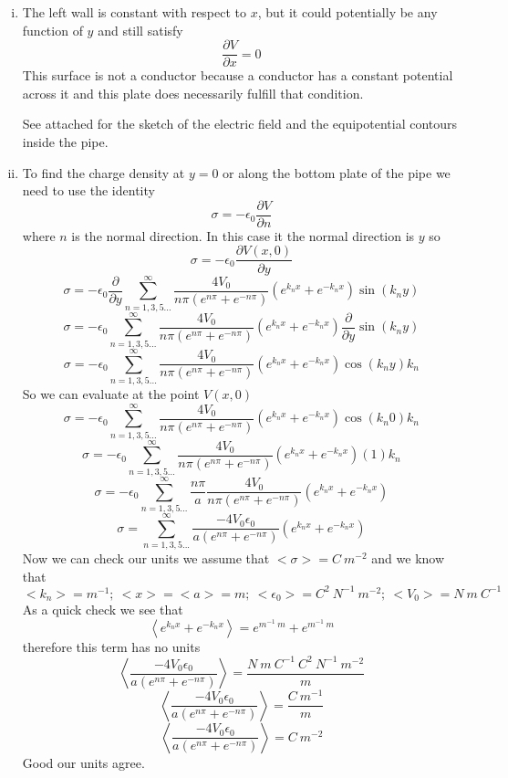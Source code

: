 \documentclass[11pt]{article}
\numberwithin{equation}{section}
\begin{document}
\begin{enumerate}[(i)]
\item
The left wall is constant with respect to $x$, but it could potentially be any function of $y$ and still satisfy $$\frac{\partial V}{\partial x} = 0$$ This surface is not a conductor because a conductor has a constant potential across it and this plate does necessarily fulfill that condition.

See attached for the sketch of the electric field and the equipotential contours inside the pipe.

\item
To find the charge density at $y=0$ or along the bottom plate of the pipe we need to use the identity
$$\sigma= -\epsilon_0\frac{\partial V}{\partial n}$$ 
where $n$ is the normal direction. In this case it the normal direction is $y$ so
$$\sigma= -\epsilon_0\frac{\partial V(x,0)}{\partial y}$$ 
$$\sigma= -\epsilon_0\frac{\partial }{\partial y}\sum_{n=1,3,5...}^{\infty}\frac{4V_0}{n\pi\left(e^{n\pi}+e^{-n\pi}\right)}\left(e^{k_nx}+e^{-k_nx}\right)\sin(k_ny)$$
$$\sigma= -\epsilon_0\sum_{n=1,3,5...}^{\infty}\frac{4V_0}{n\pi\left(e^{n\pi}+e^{-n\pi}\right)}\left(e^{k_nx}+e^{-k_nx}\right)\frac{\partial }{\partial y}\sin(k_ny)$$
$$\sigma= -\epsilon_0\sum_{n=1,3,5...}^{\infty}\frac{4V_0}{n\pi\left(e^{n\pi}+e^{-n\pi}\right)}\left(e^{k_nx}+e^{-k_nx}\right)\cos(k_ny)k_n$$
So we can evaluate at the point $V(x,0)$
$$\sigma= -\epsilon_0\sum_{n=1,3,5...}^{\infty}\frac{4V_0}{n\pi\left(e^{n\pi}+e^{-n\pi}\right)}\left(e^{k_nx}+e^{-k_nx}\right)\cos(k_n0)k_n$$
$$\sigma= -\epsilon_0\sum_{n=1,3,5...}^{\infty}\frac{4V_0}{n\pi\left(e^{n\pi}+e^{-n\pi}\right)}\left(e^{k_nx}+e^{-k_nx}\right)(1)k_n$$
$$\sigma= -\epsilon_0\sum_{n=1,3,5...}^{\infty}\frac{n\pi}{a}\frac{4V_0}{n\pi\left(e^{n\pi}+e^{-n\pi}\right)}\left(e^{k_nx}+e^{-k_nx}\right)$$
$$\sigma= \sum_{n=1,3,5...}^{\infty}\frac{-4V_0\epsilon_0}{a\left(e^{n\pi}+e^{-n\pi}\right)}\left(e^{k_nx}+e^{-k_nx}\right)$$
Now we can check our units we assume that $<\sigma> = C\ m^{-2}$ and we know that
$$<k_n> = m^{-1};\ <x>=<a>=m;\ <\epsilon_0>=C^2\ N^{-1}\ m^{-2};\ <V_0> = N\ m\ C^{-1}$$
As a quick check we see that
$$\left<e^{k_nx}+e^{-k_nx}\right> = e^{m^{-1}\ m} + e^{m^{-1}\ m}$$
therefore this term has no units
$$\left<\frac{-4V_0\epsilon_0}{a\left(e^{n\pi}+e^{-n\pi}\right)}\right>=\frac{N\ m\ C^{-1}\ C^2\ N^{-1}\ m^{-2}}{m}$$
$$\left<\frac{-4V_0\epsilon_0}{a\left(e^{n\pi}+e^{-n\pi}\right)}\right>=\frac{C\ m^{-1}}{m}$$
$$\left<\frac{-4V_0\epsilon_0}{a\left(e^{n\pi}+e^{-n\pi}\right)}\right>=C\ m^{-2}$$
Good our units agree.

\end{enumerate}
\end{document}
